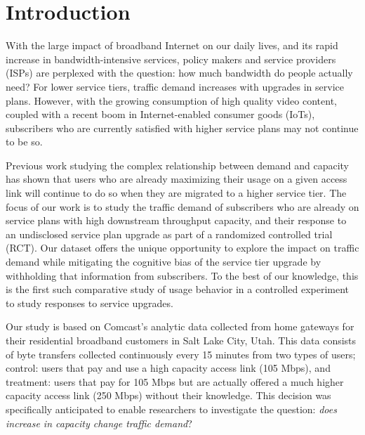 \section{Introduction}\label{sec:introduction}

With the large impact of broadband Internet on our daily lives, and 
its rapid increase in bandwidth-intensive services, policy makers and 
service providers (ISPs) are perplexed with the question: how much bandwidth do 
people actually need? For lower service tiers, traffic demand increases with 
upgrades in service plans. However, with the growing consumption of high 
quality video content, coupled with a recent boom in Internet-enabled consumer 
goods (IoTs), subscribers who are currently satisfied with higher service plans 
may not continue to be so. 

Previous work studying the complex relationship between demand and capacity has 
shown that users who are already maximizing their usage on a given access link 
will continue to do so when they are migrated to a higher service tier. The 
focus of our work is to study the traffic demand of subscribers who are already 
on service plans with high downstream throughput capacity, and their response to 
an undisclosed service plan upgrade as part of a randomized controlled trial 
(RCT). Our dataset offers the unique opportunity to explore the impact on 
traffic demand while mitigating the cognitive bias of the service tier upgrade 
by withholding that information from subscribers. To the best of our knowledge, 
this is the first such comparative study of usage behavior in a controlled 
experiment to study responses to service upgrades.

Our study is based on Comcast's analytic data collected from home gateways for 
their residential broadband customers in Salt Lake City, Utah. This data 
consists of byte transfers collected continuously every 15 minutes from two 
types of users; control: users that pay and use a high capacity access link (105 
Mbps), and treatment: users that pay for 105 Mbps but are actually offered a 
much higher capacity access link (250 Mbps) without their knowledge. This 
decision was specifically anticipated to enable researchers to investigate the 
question: \emph{does increase in capacity change traffic demand}?

